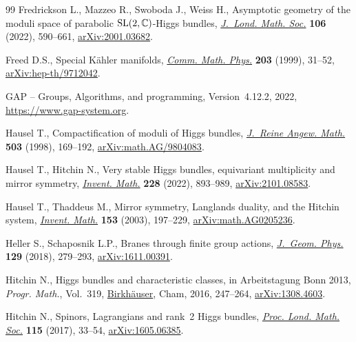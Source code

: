 \begin{thebibliography}{99}
Fredrickson L., Mazzeo R., Swoboda J., Weiss H., Asymptotic geometry of the
 moduli space of parabolic {${\rm SL}(2,{\mathbb C})$}-{H}iggs bundles,
 \href{https://doi.org/10.1112/jlms.12581}{\textit{J.~Lond. Math. Soc.}}
 \textbf{106} (2022), 590--661,
 \href{http://arxiv.org/abs/2001.03682}{arXiv:2001.03682}.

Freed D.S., Special {K}\"{a}hler manifolds,
 \href{https://doi.org/10.1007/s002200050604}{\textit{Comm. Math. Phys.}}
 \textbf{203} (1999), 31--52,
 \href{http://arxiv.org/abs/hep-th/9712042}{arXiv:hep-th/9712042}.

{{GAP} -- {G}roups}, {A}lgorithms, and programming, {V}ersion~4.12.2, 2022,
 \url{https://www.gap-system.org}.

Hausel T., Compactification of moduli of {H}iggs bundles,
 \href{https://doi.org/10.1515/crll.1998.096}{\textit{J.~Reine Angew. Math.}}
 \textbf{503} (1998), 169--192,
 \href{http://arxiv.org/abs/math.AG/9804083}{arXiv:math.AG/9804083}.

Hausel T., Hitchin N., Very stable {H}iggs bundles, equivariant multiplicity
 and mirror symmetry,
 \href{https://doi.org/10.1007/s00222-021-01093-7}{\textit{Invent. Math.}}
 \textbf{228} (2022), 893--989,
 \href{http://arxiv.org/abs/2101.08583}{arXiv:2101.08583}.

Hausel T., Thaddeus M., Mirror symmetry, {L}anglands duality, and the {H}itchin
 system, \href{https://doi.org/10.1007/s00222-003-0286-7}{\textit{Invent.
 Math.}} \textbf{153} (2003), 197--229,
 \href{http://arxiv.org/abs/math.AG0205236}{arXiv:math.AG0205236}.

Heller S., Schaposnik L.P., Branes through finite group actions,
 \href{https://doi.org/10.1016/j.geomphys.2018.03.014}{\textit{J.~Geom.
 Phys.}} \textbf{129} (2018), 279--293,
 \href{http://arxiv.org/abs/1611.00391}{arXiv:1611.00391}.

Hitchin N., Higgs bundles and characteristic classes, in Arbeitstagung {B}onn
 2013, \textit{Progr. Math.}, Vol.~319,
 \href{https://doi.org/10.1007/978-3-319-43648-7_8}{Birkh\"{a}user}, Cham,
 2016, 247--264, \href{http://arxiv.org/abs/1308.4603}{arXiv:1308.4603}.

Hitchin N., Spinors, {L}agrangians and rank~2 {H}iggs bundles,
 \href{https://doi.org/10.1112/plms.12034}{\textit{Proc. Lond. Math. Soc.}}
 \textbf{115} (2017), 33--54,
 \href{http://arxiv.org/abs/1605.06385}{arXiv:1605.06385}.


\end{thebibliography}
